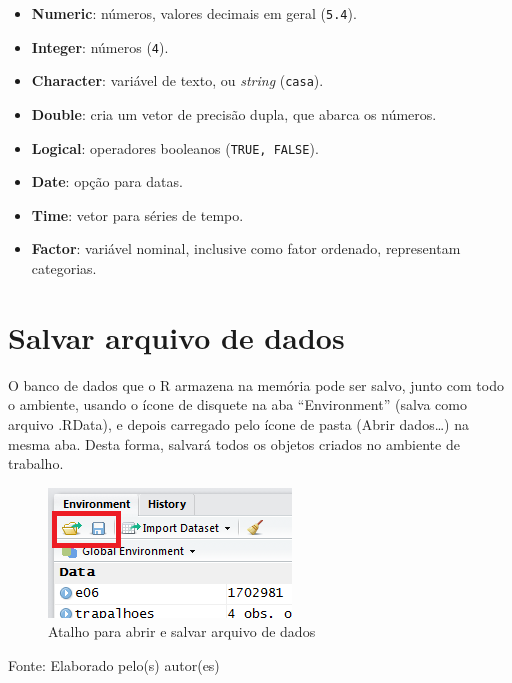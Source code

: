 \documentclass[12pt,brazil,]{book}
\providecommand{\tightlist}{%
  \setlength{\itemsep}{0pt}\setlength{\parskip}{0pt}}
\begin{document}
\begin{itemize}
\tightlist
\item
  \textbf{Numeric}: números, valores decimais em geral (\texttt{5.4}).
\item
  \textbf{Integer}: números (\texttt{4}).
\item
  \textbf{Character}: variável de texto, ou \emph{string}
  (\texttt{casa}).
\item
  \textbf{Double}: cria um vetor de precisão dupla, que abarca os
  números.
\item
  \textbf{Logical}: operadores booleanos (\texttt{TRUE,\ FALSE}).
\item
  \textbf{Date}: opção para datas.
\item
  \textbf{Time}: vetor para séries de tempo.
\item
  \textbf{Factor}: variável nominal, inclusive como fator ordenado,
  representam categorias.
\end{itemize}

\hypertarget{salvar-arquivo-de-dados}{%
\section{Salvar arquivo de dados}\label{salvar-arquivo-de-dados}}

O banco de dados que o R armazena na memória pode ser salvo, junto com
todo o ambiente, usando o ícone de disquete na aba ``Environment''
(salva como arquivo .RData), e depois carregado pelo ícone de pasta
(Abrir dados\ldots{}) na mesma aba. Desta forma, salvará todos os
objetos criados no ambiente de trabalho.

\begin{figure}

{\centering \includegraphics[width=0.6\linewidth]{r6} 

}

\caption{Atalho para abrir e salvar arquivo de dados}\label{fig:r6}
\end{figure}

Fonte: Elaborado pelo(s) autor(es)
\end{document}
